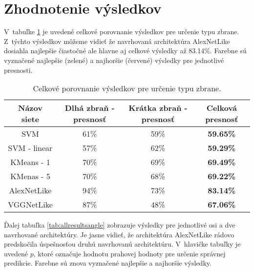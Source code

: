 
\section{Zhodnotenie výsledkov}
V~tabuľke \ref{tab:allresultsclass} je uvedené celkové porovnanie výsledkov pre určenie typu zbrane.
Z~týchto výsledkov môžeme vidieť že navrhovaná architektúra AlexNetLike dosiahla najlepšie čiastočné ale hlavne aj celkové výsledky až 83.14\%.
Farebne sú vyznačené najlepšie (zelené) a najhoršie (červené) výsledky pre jednotlivé presnosti.

\begin{table}[H]
    \centering
    \begin{tabular}{|c|c|c|c|}
        \hline
        Názov siete  & Dlhá zbraň - presnosť       & Krátka zbraň - presnosť     & Celková presnosť                        \\ \hline
        SVM          & 61\%                        & {\color[HTML]{9A0000} 59\%} & \textbf{59.65\%}                        \\ %
        SVM - linear & {\color[HTML]{9A0000} 57\%} & 62\%                        & {\color[HTML]{9A0000} \textbf{59.29\%}} \\ \hline
        KMeans - 1   & 70\%                        & 69\%                        & \textbf{69.49\%}                        \\ %
        KMenas - 5   & 70\%                        & 68\%                        & \textbf{69.22\%}                        \\ \hline
        AlexNetLike  & {\color[HTML]{009901} 94\%} & {\color[HTML]{009901} 73\%} & {\color[HTML]{009901} \textbf{83.14\%}} \\ %
        VGGNetLike   & 87\%                        & 48\%                        & \textbf{67.06\%}                        \\ \hline
    \end{tabular}
    \caption{Celkové porovnanie výsledkov pre určenie typu zbrane.}
    \label{tab:allresultsclass}
\end{table}

Ďalej tabuľka \ref{tab:allresultsangle} zobrazuje výsledky pre jednotlivé osi a dve navrhované architektúry.
Je jasne vidieť, že architektúra AlexNetLike rádovo predskočila úspešnosťou druhú navrhovanú architektúru.
V~hlavičke tabuľky je uvedené $p$, ktoré označuje hodnotu prahovej hodnoty pre určenie správnej predikcie.
Farebne sú znova vyznačené najlepšie a najhoršie výsledky.

